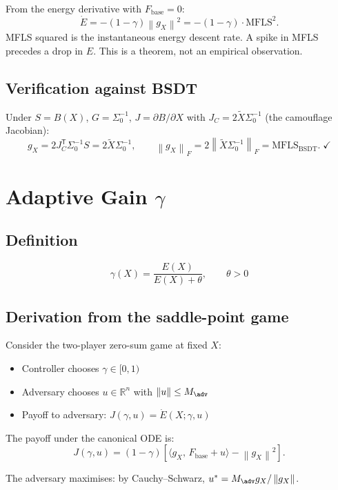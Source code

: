 \documentclass[11pt,a4paper]{article}
\theoremstyle{definition}
\newcommand{\R}{\mathbb{R}}
\newcommand{\T}{^{\mathsf{T}}}
\newcommand{\norm}[1]{\left\|#1\right\|}
\newcommand{\inner}[2]{\langle #1,\,#2\rangle}
\newcommand{\Fbase}{F_{\mathrm{base}}}
\newcommand{\gX}{g_X}
\newcommand{\mfls}{\mathrm{MFLS}}
\newcommand{\bsdt}{\mathrm{BSDT}}
\begin{document}
From the energy derivative with $\Fbase = 0$:
\[
\dot E = -(1-\gamma)\norm{\gX}^2 = -(1-\gamma)\cdot\mfls^2.
\]
MFLS squared is the instantaneous energy descent rate.
A spike in MFLS precedes a drop in $E$. This is a theorem, not an empirical observation.

\subsection{Verification against BSDT}

Under $S = B(X)$, $G = \Sigma_0^{-1}$, $J = \partial B/\partial X$ with
$J_C = 2\tilde X\Sigma_0^{-1}$ (the camouflage Jacobian):
\[
\gX = 2J_C\T \Sigma_0^{-1} S = 2\tilde X\Sigma_0^{-1},
\qquad
\norm{\gX}_F = 2\norm{\tilde X\Sigma_0^{-1}}_F = \mfls_\bsdt. \;\checkmark
\]

\section{Adaptive Gain $\gamma$}

\subsection{Definition}

\begin{lockedbox}
\[
\gamma(X) = \frac{E(X)}{E(X) + \theta}, \qquad \theta > 0
\]
\end{lockedbox}

\subsection{Derivation from the saddle-point game}

Consider the two-player zero-sum game at fixed $X$:
\begin{itemize}
\item Controller chooses $\gamma \in [0,1)$
\item Adversary chooses $u \in \R^n$ with $\norm{u} \leq M_\adv$
\item Payoff to adversary: $J(\gamma,u) = \dot E(X;\gamma,u)$
\end{itemize}

The payoff under the canonical ODE is:
\[
J(\gamma,u) = (1-\gamma)\left[\inner{\gX}{\Fbase + u} - \norm{\gX}^2\right].
\]

The adversary maximises: by Cauchy--Schwarz, $u^* = M_\adv \gX/\norm{\gX}$.
\end{document}
